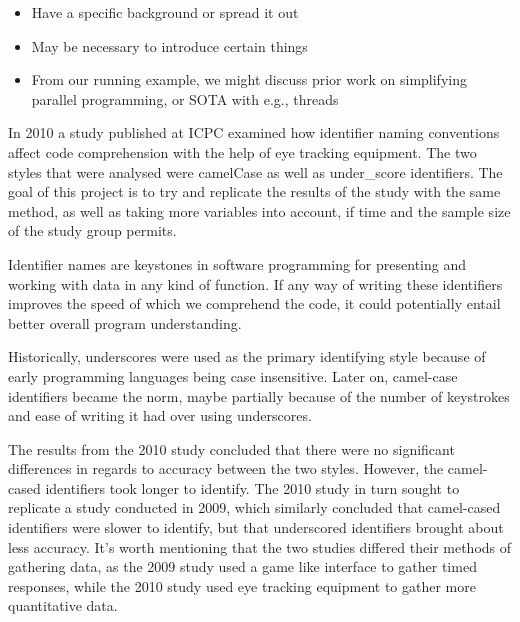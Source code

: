 \begin{itemize}
  \item Have a specific background or spread it out
  \item May be necessary to introduce certain things
  \item From our running example, we might discuss prior work on simplifying parallel programming, or SOTA with e.g., threads
\end{itemize}

In 2010 a study published at ICPC examined how identifier naming conventions affect code comprehension with the help of eye tracking equipment. The two styles that were analysed were camelCase as well as under\_score identifiers. The goal of this project is to try and replicate the results of the study with the same method, as well as taking more variables into account, if time and the sample size of the study group permits.

Identifier names are keystones in software programming for presenting and working with data in any kind of function. If any way of writing these identifiers improves the speed of which we comprehend the code, it could potentially entail better overall program understanding.

Historically, underscores were used as the primary identifying style because of early programming languages being case insensitive. Later on, camel-case identifiers became the norm, maybe partially because of the number of keystrokes and ease of writing it had over using underscores.

The results from the 2010 study concluded that there were no significant differences in regards to accuracy between the two styles. However, the camel-cased identifiers took longer to identify. The 2010 study in turn sought to replicate a study conducted in 2009, which similarly concluded that camel-cased identifiers were slower to identify, but that underscored identifiers brought about less accuracy. It's worth mentioning that the two studies differed their methods of gathering data, as the 2009 study used a game like interface to gather timed responses, while the 2010 study used eye tracking equipment to gather more quantitative data.
